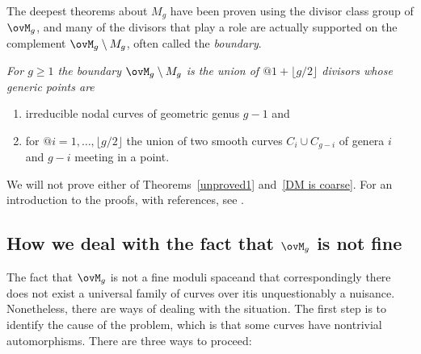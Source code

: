 The deepest theorems about $M_{g}$ have been proven using the
divisor class group
%
 of $\ovM_{g}$,
and many of the divisors that play a role are actually supported on
the complement $\ovM_{g} \setminus M_{g}$, often called the
\emph{boundary}.
%
{\meshing\par}

\begin{fact}
\it
For $g\geq 1$ the boundary $\ovM_{g}\setminus M_{g}$ is the
union of $@1+\lfloor{g/2}\rfloor$ divisors whose generic points are
\begin{enumerate}
 \item irreducible nodal curves of geometric genus $g-1$
and
 \item for $@i = 1, \dots,\lfloor{g/2}\rfloor$
the union of two smooth curves $C_{i}\cup C_{g-i}$ of genera
 $i$ and $g-i$ meeting in a point.
\end{enumerate}
\baselineskip
\end{fact}

We will not prove either of Theorems~\ref{unproved1}
and~\ref{DM is coarse}. For an introduction to the
proofs, with references, see \cite{MR1631825}.

\subsection*{How we deal with the fact that $\ovM_g$ is not fine}

The fact that $\ovM_g$ is not a fine moduli space\emdash and that
correspondingly
there does not exist a universal family
%
of curves over
it\emdash is unquestionably a nuisance. Nonetheless, there are ways of
dealing with the situation. The first step is to identify the cause of
the problem, which is that some curves have nontrivial automorphisms.
There are three ways to proceed:
%


